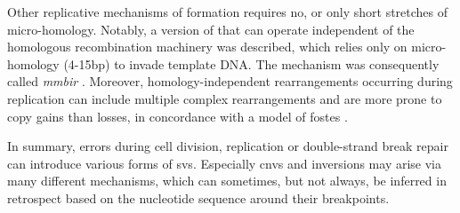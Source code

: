 Other replicative mechanisms of \sv formation requires no, or only short
stretches of micro-homology. Notably, a version of \bir that can operate
independent of the homologous recombination machinery was described, which
relies only on micro-homology (4-15bp) to invade template DNA. The mechanism
was consequently called \emph{\acf{mmbir}} \citep{Hastings2009a}.
Moreover, homology-independent rearrangements occurring during replication can
include multiple complex rearrangements and are more prone to copy gains than
losses, in concordance with a model of \acf{fostes} \citep{Zhang2009a,Hastings2009}.

In summary, errors during cell division, replication or double-strand break repair
can introduce various forms of \aclp{sv}. Especially \acp{cnv} and inversions may
arise via many different mechanisms, which can sometimes, but not always, be
inferred in retrospect based on the nucleotide sequence around their breakpoints.
